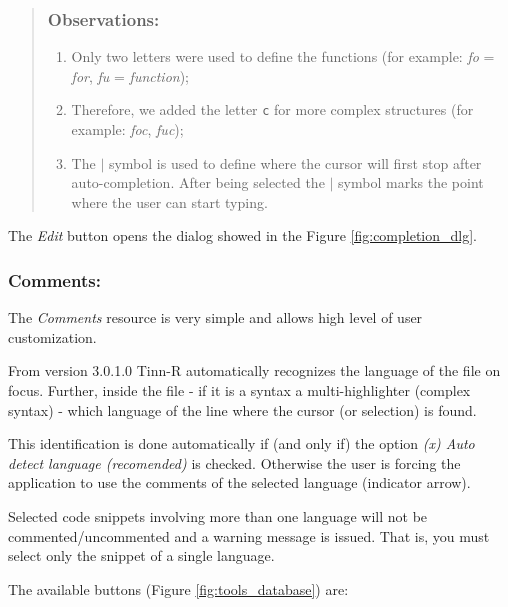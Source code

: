 \begin{quote}
\begin{footnotesize}
\begin{description}
        \subsubsection{Observations:}
        \begin{enumerate}
          \item Only two letters were used to define the functions (for example:
            \textit{fo} = \textit{for}, \textit{fu} = \textit{function});
          \item Therefore, we added the letter \texttt{c} for more complex
            structures (for example: \textit{foc}, \textit{fuc});
          \item The \texttt{$|$} symbol is used to define where the cursor
            will first stop after auto-completion. After being selected
            the \texttt{$|$} symbol marks the point where the user can start
            typing.
        \end{enumerate}
    \end{description}
  \end{footnotesize}
\end{quote}

The \textit{Edit} button opens the dialog showed in the Figure \ref{fig:completion_dlg}.


\subsubsection{Comments:}

The \textit{Comments} resource is very simple and allows high level
of user customization.

From version 3.0.1.0 Tinn-R automatically recognizes the
language of the file on focus. Further, inside the file
- if it is a syntax a multi-highlighter (complex syntax) - which language of
the line where the cursor (or selection) is found.

This identification is done automatically if (and only if) the option
\textit{(x) Auto detect language (recomended)} is checked. Otherwise
the user is forcing the application to use the comments of the selected language
(indicator arrow).

Selected code snippets involving more than one language will not be commented/uncommented
and a warning message is issued. That is, you must select only the snippet of a single language.

The available buttons
(Figure \ref{fig:tools_database})
are:

